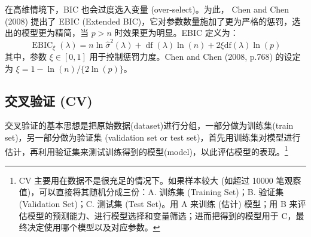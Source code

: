 在高维情境下，BIC 也会过度选入变量 (over-select)。为此，
Chen and Chen (2008) 提出了 EBIC (Extended BIC)，它对参数数量施加了更为严格的惩罚，选出的模型更为精简，当 $p>n$ 时效果更为明显。EBIC 定义为：
\begin{equation}\label{eq:lasso-ebic}
\operatorname{EBIC}_{\xi}(\lambda)=n \ln \widehat{\sigma}^{2}(\lambda)+\operatorname{df}(\lambda) \ln (n)+2 \xi \mathrm{df}(\lambda) \ln (p)
\end{equation}
其中，参数 $\xi \in[0,1]$ 用于控制惩罚力度。Chen and Chen (2008, p.768) 的设定为 $\xi=1-\ln (n) /\{2 \ln (p)\}$。


\subsection{交叉验证 (CV)}\label{sec:lasso-lambda-cv}
交叉验证的基本思想是把原始数据(dataset)进行分组，一部分做为训练集(train set)，另一部分做为验证集 (validation set or test set)，首先用训练集对模型进行估计，再利用验证集来测试训练得到的模型(model)，以此评估模型的表现。\footnote{%
  CV 主要用在数据不是很充足的情况下。如果样本较大 (如超过 10000 笔观察值)，可以直接将其随机分成三份：A. 训练集 (Training Set)；B. 验证集 (Validation Set)；C. 测试集 (Test Set)。用 A 来训练 (估计) 模型；用 B 来评估模型的预测能力、进行模型选择和变量筛选；进而把得到的模型用于 C，最终决定使用哪个模型以及对应参数。}

